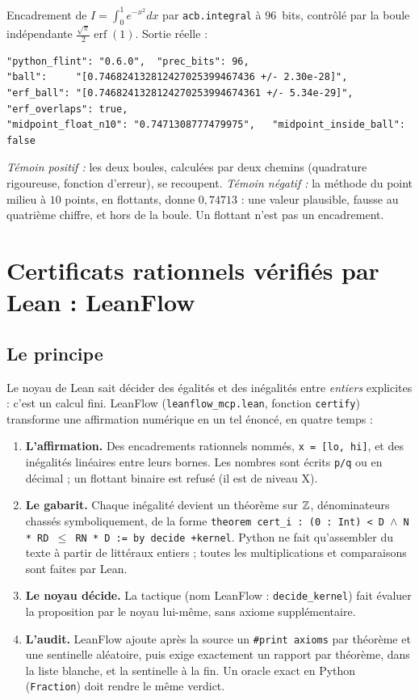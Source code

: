 \begin{numbox}
Encadrement de $I=\int_0^1e^{-x^2}dx$ par \texttt{acb.integral} à 96~bits, contrôlé par la boule indépendante
$\frac{\sqrt\pi}2\operatorname{erf}(1)$. Sortie réelle :
\begin{lstlisting}[style=appC,language={}]
"python_flint": "0.6.0",  "prec_bits": 96,
"ball":     "[0.746824132812427025399467436 +/- 2.30e-28]",
"erf_ball": "[0.7468241328124270253994674361 +/- 5.34e-29]",   "erf_overlaps": true,
"midpoint_float_n10": "0.7471308777479975",   "midpoint_inside_ball": false
\end{lstlisting}
\emph{Témoin positif :} les deux boules, calculées par deux chemins (quadrature rigoureuse, fonction d'erreur), se
recoupent. \emph{Témoin négatif :} la méthode du point milieu à $10$ points, en flottants, donne $0{,}74713$ : une valeur
plausible, fausse au quatrième chiffre, et hors de la boule. Un flottant n'est pas un encadrement.
\end{numbox}

\section{Certificats rationnels vérifiés par Lean : LeanFlow}\label{appD:sec:leanflow}

\subsection{Le principe}
Le noyau de Lean sait décider des égalités et des inégalités entre \emph{entiers} explicites : c'est un calcul fini.
LeanFlow (\texttt{leanflow\_mcp.lean}, fonction \texttt{certify}) transforme une affirmation numérique en un tel
énoncé, en quatre temps :
\begin{enumerate}
\item \textbf{L'affirmation.} Des encadrements rationnels nommés, \texttt{x = [lo, hi]}, et des inégalités linéaires
entre leurs bornes. Les nombres sont écrits \texttt{p/q} ou en décimal ; un flottant binaire est refusé (il est de niveau
X).
\item \textbf{Le gabarit.} Chaque inégalité devient un théorème sur $\mathbb{Z}$, dénominateurs chassés symboliquement, de la
forme \texttt{theorem cert\_i : (0 : Int) < D $\wedge$ N * RD $\le$ RN * D := by decide +kernel}. Python ne fait qu'assembler du
texte à partir de littéraux entiers ; toutes les multiplications et comparaisons sont faites par Lean.
\item \textbf{Le noyau décide.} La tactique  (nom LeanFlow : \texttt{decide\_kernel}) fait évaluer
la proposition par le noyau lui-même, sans axiome supplémentaire.
\item \textbf{L'audit.} LeanFlow ajoute après la source un \texttt{\#print axioms} par théorème et une sentinelle aléatoire,
puis exige exactement un rapport par théorème, dans la liste blanche, et la sentinelle à la fin. Un oracle exact en
Python (\texttt{Fraction}) doit rendre le même verdict.
\end{enumerate}


